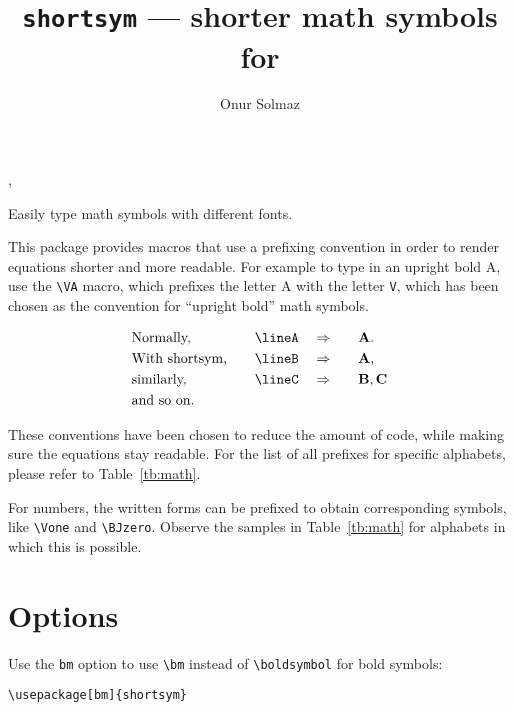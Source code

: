 \documentclass[]{article}
\title{\texttt{shortsym}\textnormal{ --- shorter math symbols for \LaTeXe}}
\author{Onur Solmaz}
\begin{document}
\maketitle

\begin{myverbbox}{\lineA}
\end{myverbbox}

\begin{myverbbox}{\lineB}
\VA
\end{myverbbox}

\begin{myverbbox}{\lineC}
\VB, \VC
\end{myverbbox}


Easily type math symbols with different fonts.

This package provides macros that use a prefixing convention in order to render
equations shorter and more readable.
For example to type in an
upright bold A, use the \verb+\VA+ macro, which prefixes the letter A
with the letter \verb+V+, which has been chosen
as the convention for ``upright bold'' math symbols.

\begin{alignat*}{4}
  &\text{Normally,}  & \lineA \quad &\Rightarrow \quad && \VA. \\
  &\text{With shortsym,} \quad  & \lineB \quad &\Rightarrow \quad && \VA, \\
  &\text{similarly,}  & \lineC \quad &\Rightarrow \quad && \VB, \VC \\
  &\text{and so on.}  &  & &&  \\
\end{alignat*}

These conventions have been chosen to reduce the amount of code,
while making sure the equations stay readable.
For the list of all prefixes for
specific alphabets, please refer to Table~\ref{tb:math}.

For numbers, the written forms can be prefixed to obtain corresponding symbols,
like \verb+\Vone+ and \verb+\BJzero+. Observe the samples in Table~\ref{tb:math}
for alphabets in which this is possible.

\section{Options}

Use the \texttt{bm} option to use \verb+\bm+ instead of \verb+\boldsymbol+ for
bold symbols:

\begin{verbatim}
\usepackage[bm]{shortsym}
\end{verbatim}
\end{document}
